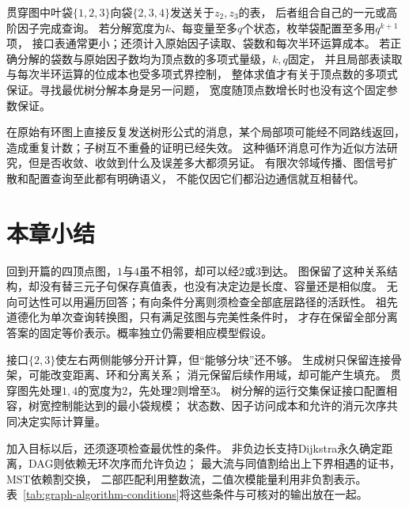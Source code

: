 贯穿图中叶袋\(\{1,2,3\}\)向袋\(\{2,3,4\}\)发送关于\(z_2,z_3\)的表，
后者组合自己的一元或高阶因子完成查询。
若分解宽度为\(k\)、每变量至多\(q\)个状态，枚举袋配置至多用\(q^{k+1}\)项，
接口表通常更小；还须计入原始因子读取、袋数和每次半环运算成本。
若正确分解的袋数与原始因子数均为顶点数的多项式量级，\(k,q\)固定，
并且局部表读取与每次半环运算的位成本也受多项式界控制，
整体求值才有关于顶点数的多项式保证。寻找最优树分解本身是另一问题，
宽度随顶点数增长时也没有这个固定参数保证。

在原始有环图上直接反复发送树形公式的消息，某个局部项可能经不同路线返回，
造成重复计数；子树互不重叠的证明已经失效。
这种循环消息可作为近似方法研究，但是否收敛、收敛到什么及误差多大都须另证。
有限次邻域传播、图信号扩散和配置查询至此都有明确语义，
不能仅因它们都沿边通信就互相替代。

\section{本章小结}
\label{sec:graph-theory-summary}

回到开篇的四顶点图，\(1\)与\(4\)虽不相邻，却可以经\(2\)或\(3\)到达。
图保留了这种关系结构，却没有替三元子句保存真值表，也没有决定边是长度、容量还是相似度。
无向可达性可以用遍历回答；有向条件分离则须检查全部底层路径的活跃性。
祖先道德化为单次查询转换图，只有满足弦图与完美性条件时，
才存在保留全部分离答案的固定等价表示。概率独立仍需要相应模型假设。

接口\(\{2,3\}\)使左右两侧能够分开计算，但“能够分块”还不够。
生成树只保留连接骨架，可能改变距离、环和分离关系；
消元保留后续作用域，却可能产生填充。
贯穿图先处理\(1,4\)的宽度为\(2\)，先处理\(2\)则增至\(3\)。
树分解的运行交集保证接口配置相容，树宽控制能达到的最小袋规模；
状态数、因子访问成本和允许的消元次序共同决定实际计算量。

加入目标以后，还须逐项检查最优性的条件。
非负边长支持Dijkstra永久确定距离，DAG则依赖无环次序而允许负边；
最大流与同值割给出上下界相遇的证书，MST依赖割交换，
二部匹配利用整数流，二值次模能量利用非负割表示。
表~\ref{tab:graph-algorithm-conditions}将这些条件与可核对的输出放在一起。

